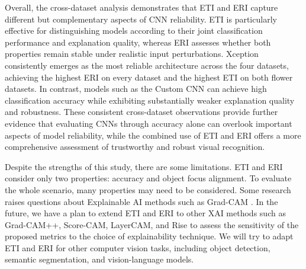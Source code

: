\documentclass[a4paper,fleqn]{cas-dc}
\begin{document}
Overall, the cross-dataset analysis demonstrates that ETI and ERI capture different but complementary aspects of CNN reliability. ETI is particularly effective for distinguishing models according to their joint classification performance and explanation quality, whereas ERI assesses whether both properties remain stable under realistic input perturbations. Xception consistently emerges as the most reliable architecture across the four datasets, achieving the highest ERI on every dataset and the highest ETI on both flower datasets. In contrast, models such as the Custom CNN can achieve high classification accuracy while exhibiting substantially weaker explanation quality and robustness. These consistent cross-dataset observations provide further evidence that evaluating CNNs through accuracy alone can overlook important aspects of model reliability, while the combined use of ETI and ERI offers a more comprehensive assessment of trustworthy and robust visual recognition.



Despite the strengths of this study, there are some limitations. ETI and ERI consider only two properties: accuracy and object focus alignment. To evaluate the whole scenario, many properties may need to be considered. Some research raises questions about Explainable AI methods such as Grad-CAM    \cite{r47,r48,r49}. In the future, we have a plan to extend ETI and ERI to other XAI methods such as Grad-CAM++\cite{r48}, Score-CAM\cite{r50}, LayerCAM\cite{r51}, and Rise \cite{r52} to assess the sensitivity of the proposed metrics to the choice of explainability technique. We will try to adapt ETI and ERI for other computer vision tasks, including object detection, semantic segmentation, and vision-language models. 

	
\end{document}
